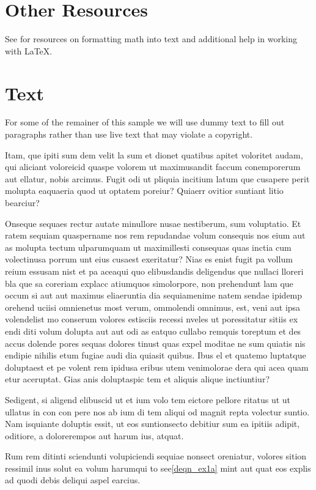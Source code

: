 \documentclass[lettersize,journal]{IEEEtran}
\begin{document}
\section{Other Resources}
See \cite{ref1,ref2,ref3,ref4,ref5} for resources on formatting math into text and additional help in working with \LaTeX .

\section{Text}
For some of the remainer of this sample we will use dummy text to fill out paragraphs rather than use live text that may violate a copyright.

Itam, que ipiti sum dem velit la sum et dionet quatibus apitet voloritet audam, qui aliciant voloreicid quaspe volorem ut maximusandit faccum conemporerum aut ellatur, nobis arcimus.
Fugit odi ut pliquia incitium latum que cusapere perit molupta eaquaeria quod ut optatem poreiur? Quiaerr ovitior suntiant litio bearciur?

Onseque sequaes rectur autate minullore nusae nestiberum, sum voluptatio. Et ratem sequiam quaspername nos rem repudandae volum consequis nos eium aut as molupta tectum ulparumquam ut maximillesti consequas quas inctia cum volectinusa porrum unt eius cusaest exeritatur? Nias es enist fugit pa vollum reium essusam nist et pa aceaqui quo elibusdandis deligendus que nullaci lloreri bla que sa coreriam explacc atiumquos simolorpore, non prehendunt lam que occum\cite{ref6} si aut aut maximus eliaeruntia dia sequiamenime natem sendae ipidemp orehend uciisi omnienetus most verum, ommolendi omnimus, est, veni aut ipsa volendelist mo conserum volores estisciis recessi nveles ut poressitatur sitiis ex endi diti volum dolupta aut aut odi as eatquo cullabo remquis toreptum et des accus dolende pores sequas dolores tinust quas expel moditae ne sum quiatis nis endipie nihilis etum fugiae audi dia quiasit quibus.
Ibus el et quatemo luptatque doluptaest et pe volent rem ipidusa eribus utem venimolorae dera qui acea quam etur aceruptat.
Gias anis doluptaspic tem et aliquis alique inctiuntiur?

Sedigent, si aligend elibuscid ut et ium volo tem eictore pellore ritatus ut ut ullatus in con con pere nos ab ium di tem aliqui od magnit repta volectur suntio. Nam isquiante doluptis essit, ut eos suntionsecto debitiur sum ea ipitiis adipit, oditiore, a dolorerempos aut harum ius, atquat.

Rum rem ditinti sciendunti volupiciendi sequiae nonsect oreniatur, volores sition ressimil inus solut ea volum harumqui to see\eqref{deqn_ex1a} mint aut quat eos explis ad quodi debis deliqui aspel earcius.
\end{document}
